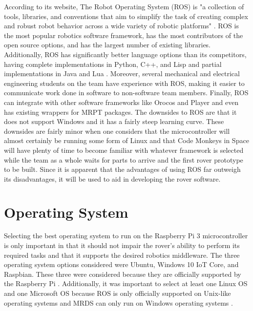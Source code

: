 \documentclass[onecolumn, draftclsnofoot,10pt, compsoc]{IEEEtran}
\begin{document}
According to its website, The Robot Operating System (ROS) is "a collection of tools, libraries, and conventions that aim to simplify the task of creating complex and robust robot behavior across a wide variety of robotic platforms" \cite{ROS}. ROS is the most popular robotics software framework, has the most contributors of the open source options, and has the largest number of existing libraries. Additionally, ROS has significantly better language options than its competitors, having complete implementations in Python, C++, and Lisp and partial implementations in Java and Lua \cite{ROS2}. Moreover, several mechanical and electrical engineering students on the team have experience with ROS, making it easier to communicate work done in software to non-software team members. Finally, ROS can integrate with other software frameworks like Orocos and Player and even has existing wrappers for MRPT packages. The downsides to ROS are that it does not support Windows and it has a fairly steep learning curve. These downsides are fairly minor when one considers that the microcontroller will almost certainly be running some form of Linux and that Code Monkeys in Space will have plenty of time to become familiar with whatever framework is selected while the team as a whole waits for parts to arrive and the first rover prototype to be built. Since it is apparent that the advantages of using ROS far outweigh its disadvantages, it will be used to aid in developing the rover software.

\section{Operating System}
Selecting the best operating system to run on the Raspberry Pi 3 microcontroller is only important in that it should not impair the rover's ability to perform its required tasks and that it supports the desired robotics middleware. The three operating system options considered were Ubuntu, Windows 10 IoT Core, and Raspbian. These three were considered because they are officially supported by the Raspberry Pi \cite{RaspberryPi}. Additionally, it was important to select at least one Linux OS and one Microsoft OS because ROS is only officially supported on Unix-like operating systems \cite{ROS_OS} and MRDS can only run on Windows operating systems \cite{MRDS_OS}.
\end{document}
